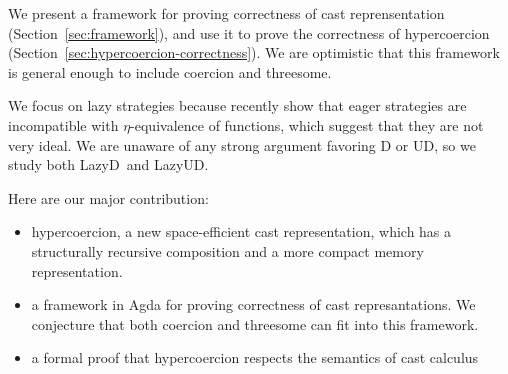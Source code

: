 \documentclass[acmsmall,review,anonymous]{acmart}\settopmatter{printfolios=true,printccs=false,printacmref=false}
\newcommand{\lazyUD}{Lazy\;UD}
\newcommand{\lazyD}{Lazy\;D}
\begin{document}
We present a framework for proving correctness of cast reprensentation 
(Section~\ref{sec:framework}), and use it to prove the correctness of 
hypercoercion (Section~\ref{sec:hypercoercion-correctness}). We are optimistic 
that this framework is general enough to include coercion and threesome.

We focus on lazy strategies because recently \citet{new2019gradual} 
show that eager strategies are incompatible with $\eta$-equivalence of 
functions, which suggest that they are not very ideal. We are unaware of any 
strong argument favoring D or UD, so we study both \lazyD\ and \lazyUD.


Here are our major contribution:
\begin{itemize}
	\item hypercoercion, a new space-efficient cast representation, which has a 
	structurally recursive composition and a more compact memory 	
	representation.
	\item a framework in Agda for proving correctness of cast represantations. 
	We conjecture that both coercion and threesome can fit into this framework.
	\item a formal proof that hypercoercion respects the semantics of cast 
	calculus
\end{itemize}
\end{document}
